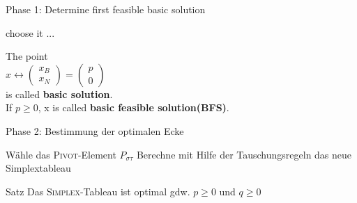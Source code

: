 \documentclass[10pt]{beamer}
\begin{document}
\begin{frame}{Phase 1: Determine first feasible basic solution}
	\begin{algorithm}[H]
		\caption{Phase 1: Determine first feasible basic solution (vertex)}
		\label{alg:seq}
		\begin{algorithmic}[1]
			\STATE choose it
			\ENDIF
			\STATE ...
		\end{algorithmic}
	\end{algorithm}
	
	\begin{definition}
		The point \\
		\vspace{0.15cm}
		$x \leftrightarrow \left(\begin{array}{c}  x_B \\ x_N \end{array}\right) = \left(\begin{array}{c}p \\ 0 \end{array}\right)$\\
		\vspace{0.15cm}
		is called \textbf{basic solution}. \\If $p \geq 0$, x is called \textbf{basic feasible solution(BFS)}.
	\end{definition}
\end{frame}

\begin{frame}{Phase 2: Bestimmung der optimalen Ecke}
	\begin{algorithm}[H]
		\caption{Phase 2: Bestimmung der optimalen Ecke}
		\label{alg:seq}
		\begin{algorithmic}[1]
			\STATE Wähle das \textsc{Pivot}-Element $ P_{\sigma \tau} $
			\STATE Berechne mit Hilfe der Tauschungsregeln das neue Simplextableau
			\ENDWHILE
		\end{algorithmic}
	\end{algorithm}
	\pause
	\begin{alertblock}{Satz}
		Das \textsc{Simplex}-Tableau ist optimal gdw. $ p \geq 0 $ und $ q \geq 0 $
	\end{alertblock}
\end{frame}
\end{document}
